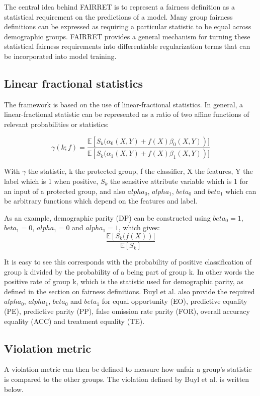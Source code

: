 The central idea behind FAIRRET is to represent a fairness definition as a statistical requirement on the predictions of a model. Many group fairness definitions can be expressed as requiring a particular statistic to be equal across demographic groups. FAIRRET provides a general mechanism for turning these statistical fairness requirements into differentiable regularization terms that can be incorporated into model training.

\subsection{Linear fractional statistics}
The framework is based on the use of linear-fractional statistics. In general, a linear-fractional statistic can be represented as a ratio of two affine functions of relevant probabilities or statistics:

\[
\gamma(k; f)
=
\frac{
    \mathbb{E}\left[S_k(\alpha_0(X,Y) + f(X)\beta_0(X,Y)\right)]
    }{
    \mathbb{E}\left[S_k(\alpha_1(X,Y) + f(X)\beta_1(X,Y)\right)]
    }
\]

With $\gamma$ the statistic, k the protected group, f the classifier, X the features, Y the label which is 1 when positive, $S_k$ the sensitive attribute variable which is 1 for an input of a protected group, and also $alpha_0$, $alpha_1$, $beta_0$ and $beta_1$ which can be arbitrary functions which depend on the features and label.

As an example, demographic parity (DP) can be constructed using $beta_0 = 1$, $beta_1 = 0$, $alpha_1 = 0$ and $alpha_1 = 1$, which gives:
\[
\frac{
    \mathbb{E}\left[S_k(f(X)\right)]
    }{
    \mathbb{E}\left[S_k\right]
    }
\]

It is easy to see this corresponds with the probability of positive classification of group k divided by the probability of a being part of group k. In other words the positive rate of group k, which is the statistic used for demographic parity, as defined in the section on fairness definitions. Buyl et al. \cite{fairret} also provide the required $alpha_0$, $alpha_1$, $beta_0$ and $beta_1$ for equal opportunity (EO), predictive equality (PE), predictive parity (PP), false omission rate parity (FOR), overall accuracy equality (ACC) and treatment equality (TE).


\subsection{Violation metric}
A violation metric can then be defined to measure how unfair a group's statistic is compared to the other groups. The violation defined by Buyl et al. \cite{fairret} is written below.

